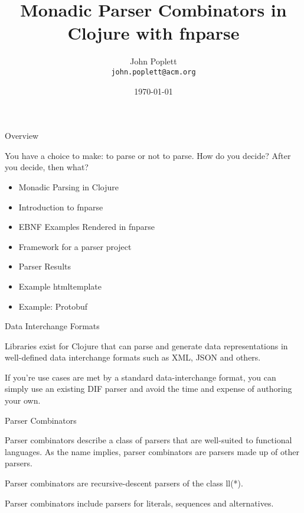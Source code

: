 \documentclass[presentation]{beamer}
\begin{document}
\title{Monadic Parser Combinators in Clojure with fnparse}
\author{John Poplett\\
  \texttt{john.poplett@acm.org}}
\date{\today}

\begin{frame}[plain]
\titlepage
\end{frame}

\begin{frame}{Overview}

  You have a choice to make: to parse or not to parse. How do you
  decide? After you decide, then what?

\begin{itemize}
\item Monadic Parsing in Clojure
\item Introduction to fnparse
\item EBNF Examples Rendered in fnparse
\item Framework for a parser project
\item Parser Results
\item Example htmltemplate
\item Example: Protobuf
\end{itemize}

\end{frame}

\begin{frame}{Data Interchange Formats}

  Libraries exist for Clojure that can parse and generate data
  representations in well-defined data interchange formats such as
  XML, JSON and others.

  If you're use cases are met by a standard data-interchange format,
  you can simply use an existing DIF parser and avoid the time and
  expense of authoring your own.

\end{frame}

\begin{frame}{Parser Combinators}

  Parser combinators describe a class of parsers that are well-suited
  to functional languages. As the name implies, parser combinators are
  parsers made up of other parsers.

  Parser combinators are recursive-descent parsers of the class ll(*).

  Parser combinators include parsers for literals, sequences and
  alternatives.

\end{frame}
\end{document}
